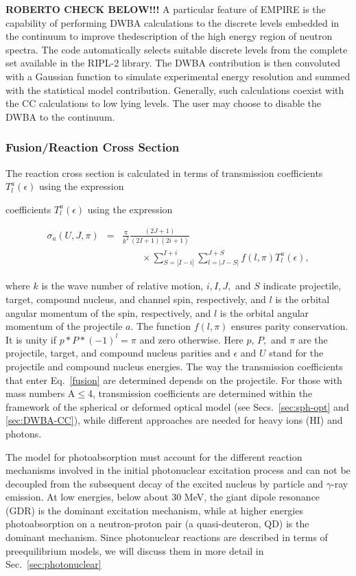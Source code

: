\documentclass[twocolumn,amsmath,amssymb,10pt,groupedaddress,a4paper]{revtex4}
\begin{document}
\textbf{ROBERTO CHECK BELOW!!!} A particular feature of EMPIRE is
the capability of performing DWBA calculations to the discrete levels
embedded in the continuum to improve thedescription of the high energy
region of neutron spectra. The code automatically selects suitable
discrete levels from the complete set available in the RIPL-2 library.
The DWBA contribution is then convoluted with a Gaussian function
to simulate experimental energy resolution and summed with the
statistical model contribution. Generally, such calculations coexist
with the CC calculations to low lying levels. The user may choose to disable
the DWBA to the continuum.


\subsubsection{Fusion/Reaction Cross Section\label{sec:fusion}}
The reaction cross section is calculated in terms of transmission
coefficients $T_{l}^{a}(\epsilon)$ using the expression

coefficients $T_{l}^{a}(\epsilon)$ using the expression

\begin{eqnarray}
\sigma_{a}(U,J,\pi) & = & \frac{\pi}{k^{2}}\frac{(2J+1)}{(2I+1)(2i+1)}\label{fusion}\\
 &  & \qquad\times
 \sum_{S=|I-i|}^{I+i}\sum_{l=|J-S|}^{J+S}f(l,\pi)T_{l}^{a}(\epsilon),\nonumber
 \end{eqnarray}


\noindent where $k$ is the wave number of relative motion, $i,I,J,$
and $S$ indicate projectile, target, compound nucleus, and channel
spin, respectively, and $l$ is the orbital angular momentum of the
spin, respectively, and $l$ is the orbital angular momentum of the
projectile $a$. The function $f(l,\pi)$ ensures parity conservation.
It is unity if $p*P*(-1)^{l}=\pi$ and zero otherwise. Here $p,\, P,$
and $\pi$ are the projectile, target, and compound nucleus parities and
$\epsilon$ and $U$ stand for the projectile and compound nucleus
energies. The way the transmission coefficients that enter Eq.~\ref{fusion}
are determined depends on the projectile. For those with mass numbers
A$\leq$4, transmission coefficients are determined within
the framework of the spherical or deformed optical model (see
Secs.~\ref{sec:sph-opt} and \ref{sec:DWBA-CC}),
while different approaches are needed for heavy ions (HI) and photons.

The model for photoabsorption must account for the different reaction
mechanisms involved in the initial photonuclear excitation process
and can not be decoupled from the subsequent decay of the excited
nucleus by particle and $\gamma$-ray emission. At low energies, below
about 30 MeV, the giant dipole resonance (GDR) is the dominant excitation
mechanism, while at higher energies photoabsorption on a neutron-proton
pair (a quasi-deuteron, QD) is the dominant mechanism. Since photonuclear
reactions are described in terms of preequilibrium models, we will discuss
them in more detail in Sec.~\ref{sec:photonuclear}
\end{document}
